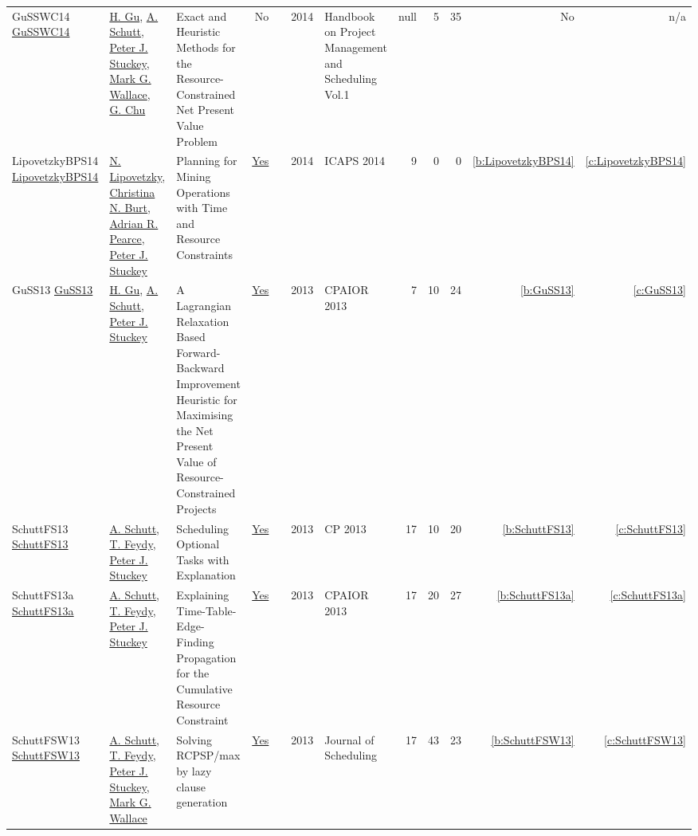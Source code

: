 {\begin{longtable}{>{\raggedright\arraybackslash}p{3cm}>{\raggedright\arraybackslash}p{6cm}>{\raggedright\arraybackslash}p{6.5cm}rrrp{2.5cm}rrrrr}
GuSSWC14 \href{http://dx.doi.org/10.1007/978-3-319-05443-8_14}{GuSSWC14} & \hyperref[auth:a342]{H. Gu}, \hyperref[auth:a125]{A. Schutt}, \hyperref[auth:a126]{Peter J. Stuckey}, \hyperref[auth:a156]{Mark G. Wallace}, \hyperref[auth:a349]{G. Chu} & Exact and Heuristic Methods for the Resource-Constrained Net Present Value Problem & No & \cite{GuSSWC14} & 2014 & Handbook on Project Management and Scheduling Vol.1 & null & 5 & 35 & No & n/a\\
LipovetzkyBPS14 \href{http://www.aaai.org/ocs/index.php/ICAPS/ICAPS14/paper/view/7942}{LipovetzkyBPS14} & \hyperref[auth:a327]{N. Lipovetzky}, \hyperref[auth:a326]{Christina N. Burt}, \hyperref[auth:a328]{Adrian R. Pearce}, \hyperref[auth:a126]{Peter J. Stuckey} & Planning for Mining Operations with Time and Resource Constraints & \href{../works/LipovetzkyBPS14.pdf}{Yes} & \cite{LipovetzkyBPS14} & 2014 & ICAPS 2014 & 9 & 0 & 0 & \ref{b:LipovetzkyBPS14} & \ref{c:LipovetzkyBPS14}\\
GuSS13 \href{https://doi.org/10.1007/978-3-642-38171-3\_24}{GuSS13} & \hyperref[auth:a342]{H. Gu}, \hyperref[auth:a125]{A. Schutt}, \hyperref[auth:a126]{Peter J. Stuckey} & A Lagrangian Relaxation Based Forward-Backward Improvement Heuristic for Maximising the Net Present Value of Resource-Constrained Projects & \href{../works/GuSS13.pdf}{Yes} & \cite{GuSS13} & 2013 & CPAIOR 2013 & 7 & 10 & 24 & \ref{b:GuSS13} & \ref{c:GuSS13}\\
SchuttFS13 \href{https://doi.org/10.1007/978-3-642-40627-0\_47}{SchuttFS13} & \hyperref[auth:a125]{A. Schutt}, \hyperref[auth:a155]{T. Feydy}, \hyperref[auth:a126]{Peter J. Stuckey} & Scheduling Optional Tasks with Explanation & \href{../works/SchuttFS13.pdf}{Yes} & \cite{SchuttFS13} & 2013 & CP 2013 & 17 & 10 & 20 & \ref{b:SchuttFS13} & \ref{c:SchuttFS13}\\
SchuttFS13a \href{https://doi.org/10.1007/978-3-642-38171-3\_16}{SchuttFS13a} & \hyperref[auth:a125]{A. Schutt}, \hyperref[auth:a155]{T. Feydy}, \hyperref[auth:a126]{Peter J. Stuckey} & Explaining Time-Table-Edge-Finding Propagation for the Cumulative Resource Constraint & \href{../works/SchuttFS13a.pdf}{Yes} & \cite{SchuttFS13a} & 2013 & CPAIOR 2013 & 17 & 20 & 27 & \ref{b:SchuttFS13a} & \ref{c:SchuttFS13a}\\
SchuttFSW13 \href{https://doi.org/10.1007/s10951-012-0285-x}{SchuttFSW13} & \hyperref[auth:a125]{A. Schutt}, \hyperref[auth:a155]{T. Feydy}, \hyperref[auth:a126]{Peter J. Stuckey}, \hyperref[auth:a156]{Mark G. Wallace} & Solving RCPSP/max by lazy clause generation & \href{../works/SchuttFSW13.pdf}{Yes} & \cite{SchuttFSW13} & 2013 & Journal of Scheduling & 17 & 43 & 23 & \ref{b:SchuttFSW13} & \ref{c:SchuttFSW13}\\

\end{longtable}}
